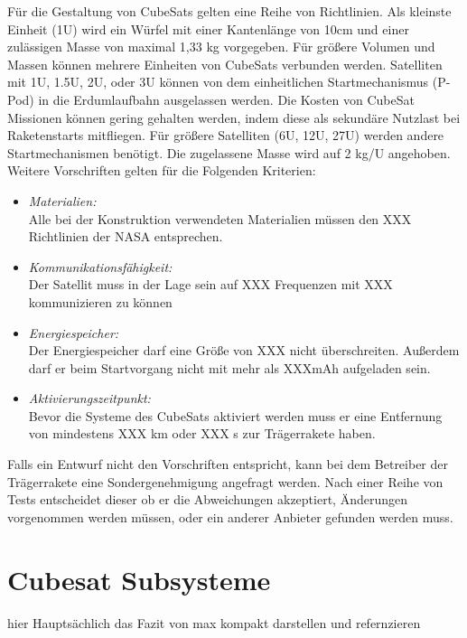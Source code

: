 	
	\begin{-}
Für die Gestaltung von CubeSats gelten eine Reihe von Richtlinien. Als kleinste Einheit (1U) wird ein Würfel mit einer Kantenlänge von 10cm und einer zulässigen Masse von maximal 1,33 kg vorgegeben. Für größere Volumen und Massen können mehrere Einheiten von CubeSats verbunden werden. Satelliten mit 1U, 1.5U, 2U, oder 3U können von dem einheitlichen Startmechanismus (P-Pod) in die Erdumlaufbahn ausgelassen werden. Die Kosten von CubeSat Missionen können gering gehalten werden, indem diese als sekundäre Nutzlast bei Raketenstarts mitfliegen. Für größere Satelliten (6U, 12U, 27U) werden andere Startmechanismen benötigt. Die zugelassene Masse wird auf 2 kg/U angehoben. Weitere Vorschriften gelten für die Folgenden Kriterien:
		\begin{itemize}
			\item \textit{Materialien:} 	\\ Alle bei der Konstruktion verwendeten Materialien müssen den XXX Richtlinien der NASA entsprechen.
			\item \textit{Kommunikationsfähigkeit:}	 \\ Der Satellit muss in der Lage sein auf XXX Frequenzen mit XXX kommunizieren zu können
			\item \textit{Energiespeicher:} \\ Der Energiespeicher darf eine Größe von XXX nicht überschreiten. Außerdem darf er beim Startvorgang nicht mit mehr als XXXmAh aufgeladen sein.
			\item \textit{Aktivierungszeitpunkt:} \\ Bevor die Systeme des CubeSats aktiviert werden muss er eine Entfernung von mindestens XXX km oder XXX s zur Trägerrakete haben.
		\end{itemize}
Falls ein Entwurf nicht den Vorschriften entspricht, kann bei dem Betreiber der Trägerrakete eine Sondergenehmigung angefragt werden. Nach einer Reihe von Tests entscheidet dieser ob er die Abweichungen akzeptiert, Änderungen vorgenommen werden müssen, oder ein anderer Anbieter gefunden werden muss. 
		\end{-}

			
	\section{Cubesat Subsysteme}
	hier Hauptsächlich das Fazit von max kompakt darstellen und refernzieren
